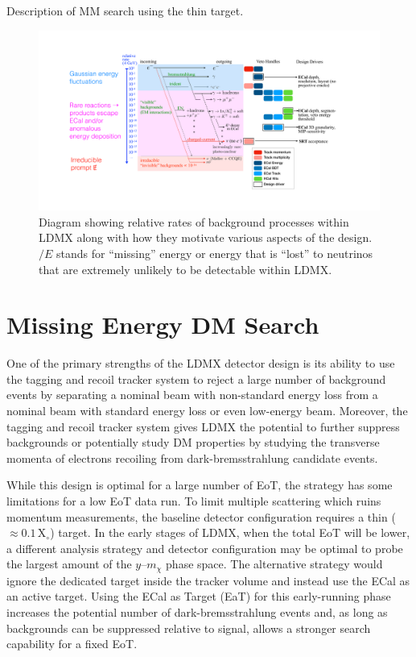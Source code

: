 \begin{todoenv}
Description of MM search using the thin target.
\end{todoenv}

\begin{figure}
  \centering
  \includegraphics[width=\textwidth]{figures/ldmx/experiment/reaction_staircase_with_designDrivers.pdf}
  \caption{
    Diagram showing relative rates of background processes within LDMX along with
    how they motivate various aspects of the design. $\slash{E}$ stands for ``missing''
    energy or energy that is ``lost'' to neutrinos that are extremely unlikely to be
    detectable within LDMX.
  }
  \label{fig:ldmx-bkgd-staircase}
\end{figure}

\section{Missing Energy DM Search}
One of the primary strengths of the LDMX detector design is its ability to use the tagging
and recoil tracker system to reject a large number of background events by separating a nominal
beam with non-standard energy loss from a nominal beam with standard energy loss or even low-energy
beam. Moreover, the tagging and recoil tracker system gives LDMX the potential to further suppress
backgrounds or potentially study DM properties by studying the transverse momenta of electrons
recoiling from dark-bremsstrahlung candidate events.

While this design is optimal for a large number of EoT, the strategy has some limitations for a low
EoT data run. To limit multiple scattering which ruins momentum measurements, the baseline detector
configuration requires a thin ($\approx 0.1 \,\mathrm{X}_\circ$) target. In the early stages of
LDMX, when the total EoT will be lower, a different analysis strategy and detector configuration
may be optimal to probe the largest amount of the $y$--$m_\chi$ phase space. The alternative
strategy would ignore the dedicated target inside the tracker volume and instead use the ECal as an
active target. Using the ECal as Target (EaT) for this early-running phase increases the potential
number of dark-bremsstrahlung events and, as long as backgrounds can be suppressed relative to
signal, allows a stronger search capability for a fixed EoT.

